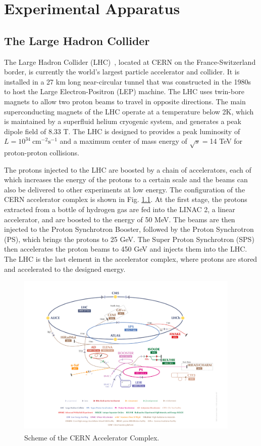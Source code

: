 \documentclass[thesis.tex]{subfiles}
\begin{document}
\chapter{Experimental Apparatus}
\label{ch2}

\section{The Large Hadron Collider}
The Large Hadron Collider (LHC)~\cite{LHCTDR}, located at CERN on the France-Switzerland border, is currently the world's largest particle accelerator and collider. 
It is installed in a 27 km long near-circular tunnel that was constructed in the 1980s to host the Large Electron-Positron (LEP) machine. 
The LHC uses twin-bore magnets to allow two proton beams to travel in opposite directions. 
The main superconducting magnets of the LHC operate at a temperature below 2K, which is maintained by a superfluid helium cryogenic system, and generates a peak dipole field of 8.33 T. 
The LHC is designed to provides a peak luminosity of $L = 10^{34}\ \text{cm}^{-2}\text{s}^{-1}$ and a maximum center of mass energy of $\sqrt{s} = $14 TeV for proton-proton collisions. 

The protons injected to the LHC are boosted by a chain of accelerators, each of which increases the energy of the protons to a certain scale and the beams can also be delivered to other experiments at low energy. 
The configuration of the CERN accelerator complex is shown in Fig. \ref{fig:LHC}. 
At the first stage, the protons extracted from a bottle of hydrogen gas are fed into the LINAC 2, a linear accelerator, and are boosted to the energy of 50 MeV.  
The beams are then injected to the Proton Synchrotron Booster, followed by the Proton Synchrotron (PS), which brings the protons to 25 GeV. 
The Super Proton Synchrotron (SPS) then accelerates the proton beams to 450 GeV and injects them into the LHC. 
The LHC is the last element in the accelerator complex, where protons are stored and accelerated to the designed energy.

\begin{figure}[hbt]
	\centering
	\includegraphics[width=0.95\textwidth]{plot/LHCcomplex.png}
	\caption{Scheme of the CERN Accelerator Complex.}
	\label{fig:LHC}
\end{figure}
\end{document}
